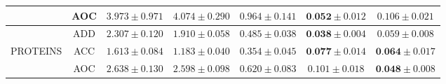 \begin{table}[h!]
{\begin{tabular}{lcccccc}
          & AOC          & $3.973 \pm 0.971$ & $4.074 \pm 0.290$ & $0.964 \pm 0.141$ & $\textbf{0.052} \pm 0.012$ & $0.106 \pm 0.021$\\
         \midrule
          & ADD          & $2.307 \pm 0.120$ & $1.910 \pm 0.058$ & $0.485 \pm 0.038$ & $\textbf{0.038} \pm 0.004$ & $0.059 \pm 0.008$\\
         PROTEINS & ACC  & $1.613 \pm 0.084$ & $1.183 \pm 0.040$ & $0.354 \pm 0.045$ & $\textbf{0.077} \pm 0.014$ & $\textbf{0.064} \pm 0.017$\\
          & AOC          & $2.638 \pm 0.130$ & $2.598 \pm 0.098$ & $0.620 \pm 0.083$ & $0.101 \pm 0.018$ & $\textbf{0.048} \pm 0.008$\\
         \bottomrule

    \end{tabular}}
\end{table}